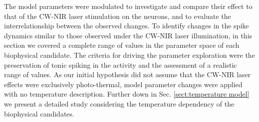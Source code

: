 The model parameters were modulated to investigate and compare their effect to that of the CW-NIR laser stimulation on the neurons, and to evaluate the interrelationship between the observed changes. To identify changes in the spike dynamics similar to those observed under the CW-NIR laser illumination, in this section we covered a complete range of values in the parameter space of each biophysical candidate. The criteria for driving the parameter exploration were the preservation of tonic spiking in the activity and the assessment of a realistic range of values.
As our initial hypothesis did not assume that the CW-NIR laser effects were exclusively photo-thermal, model parameter changes were applied with no temperature description. Further down in Sec. \ref{sect:temperature model} we present a detailed study considering the temperature dependency of the biophysical candidates. 

